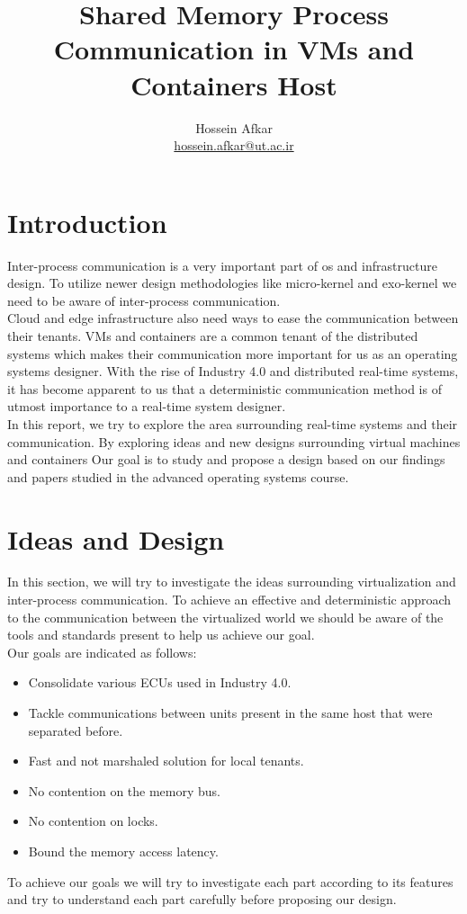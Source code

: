 \documentclass[a4paper, 11pt, twocolumn]{article}
\title{Shared Memory Process Communication in VMs and Containers Host}
\author{Hossein Afkar\\ \href{mailto:hossein.afkar@ut.ac.ir}{hossein.afkar@ut.ac.ir}}
\affil{Department of Computer Science, University Of Tehran}
\theoremstyle{nonumberplain}
\begin{document}
\maketitle

\section{Introduction}
Inter-process communication is a very important part of os and infrastructure
design. To utilize newer design methodologies like micro-kernel and
exo-kernel we need to be aware of inter-process communication. \\
Cloud and edge infrastructure also need ways to ease the communication
between their tenants. VMs and containers are a common tenant of the
distributed systems which makes their communication more important for us as
an operating systems designer. With the rise of Industry 4.0 and 
distributed real-time systems, it has become apparent to us that a deterministic
communication method is of utmost importance to a real-time system
designer. \\
In this report, we try to explore the area surrounding real-time systems and
their communication. By exploring ideas and new designs surrounding virtual
machines and containers Our goal is to study and propose a design based on our
findings and papers studied in the advanced operating systems course.
\section{Ideas and Design}
In this section, we will try to investigate the ideas surrounding virtualization
and inter-process communication. To achieve an effective and
deterministic approach to the communication between the virtualized world we
should be aware of the tools and standards present to help us achieve our
goal. \\
Our goals are indicated as follows:
\begin{itemize}
    \item Consolidate various ECUs used in Industry 4.0.
    \item Tackle communications between units present in the same
        host that were separated before.
    \item Fast and not marshaled solution for local tenants.
    \item No contention on the memory bus.
    \item No contention on locks.
    \item Bound the memory access latency.
\end{itemize}
To achieve our goals we will try to investigate each part according to
its features and try to understand each part carefully before proposing our
design.
\end{document}
